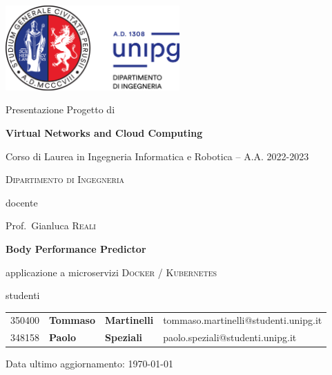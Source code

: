 \documentclass[12pt,a4paper]{report}
\begin{document}
\begin{titlepage}
	\centering
	\includegraphics[width=0.5\textwidth]{logounipg2021}\par\vspace{1cm}
	\large{Presentazione Progetto di}\par
	\large{\textbf{Virtual Networks and Cloud Computing}}\par
	\small{Corso di Laurea in Ingegneria Informatica e Robotica -- A.A. 2022-2023}\par
	\textsc{\small{Dipartimento di Ingegneria}}\par

	\vspace{0.5cm}
	docente\par
	Prof.~Gianluca \textsc{Reali}

	\vspace{1cm}
	\vspace{1cm}
	\textbf{\huge{Body Performance Predictor}}\par
	\vspace{0.2cm}
	applicazione a microservizi \textsc{Docker / Kubernetes}\par
	\vspace{7cm}

	\large{studenti}\par
	\vspace{0.2cm}
	\begin{tabular}{ l l l l }
	\large{350400} & \large{\textbf{Tommaso}} & \large{\textbf{Martinelli}} & \large{tommaso.martinelli@studenti.unipg.it}\\
	\large{348158} & \large{\textbf{Paolo}} & \large{\textbf{Speziali}} & \large{paolo.speziali@studenti.unipg.it}\\
	\end{tabular}

	\vfill
	\raggedright
	\small{Data ultimo aggiornamento: \today}
\end{titlepage}
\restoregeometry
\normalfont
\newpage \thispagestyle{empty} \ \newpage
\onehalfspacing
\tableofcontents
\end{document}
